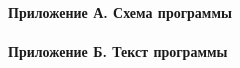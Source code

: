 \tableofcontents                                
\paragraph{Приложение А. Схема программы}
\paragraph{Приложение Б. Текст программы}
\thispagestyle{empty} %
\newpage
